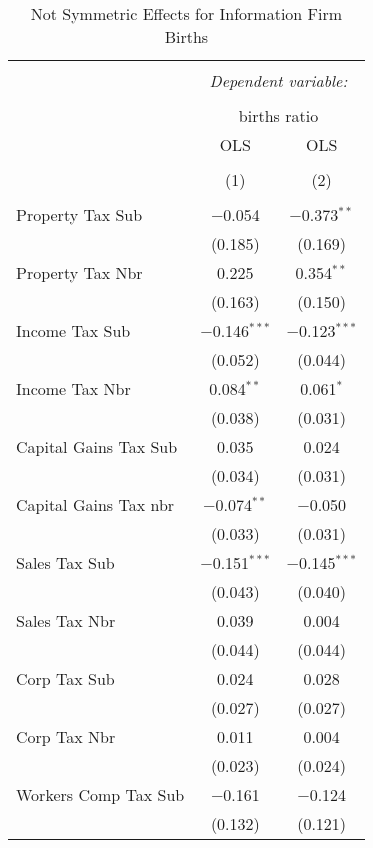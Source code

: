 
\begin{table}[!htbp] \centering 
  \caption{Not Symmetric Effects for  Information Firm Births} 
  \label{} 
\begin{tabular}{@{\extracolsep{5pt}}lcc} 
\\[-1.8ex]\hline 
\hline \\[-1.8ex] 
 & \multicolumn{2}{c}{\textit{Dependent variable:}} \\ 
\cline{2-3} 
\\[-1.8ex] & \multicolumn{2}{c}{births ratio} \\ 
 & OLS & OLS \\ 
\\[-1.8ex] & (1) & (2)\\ 
\hline \\[-1.8ex] 
 Property Tax Sub & $-$0.054 & $-$0.373$^{**}$ \\ 
  & (0.185) & (0.169) \\ 
  Property Tax Nbr & 0.225 & 0.354$^{**}$ \\ 
  & (0.163) & (0.150) \\ 
  Income Tax Sub & $-$0.146$^{***}$ & $-$0.123$^{***}$ \\ 
  & (0.052) & (0.044) \\ 
  Income Tax Nbr & 0.084$^{**}$ & 0.061$^{*}$ \\ 
  & (0.038) & (0.031) \\ 
  Capital Gains Tax Sub & 0.035 & 0.024 \\ 
  & (0.034) & (0.031) \\ 
  Capital Gains Tax nbr & $-$0.074$^{**}$ & $-$0.050 \\ 
  & (0.033) & (0.031) \\ 
  Sales Tax Sub & $-$0.151$^{***}$ & $-$0.145$^{***}$ \\ 
  & (0.043) & (0.040) \\ 
  Sales Tax Nbr & 0.039 & 0.004 \\ 
  & (0.044) & (0.044) \\ 
  Corp Tax Sub & 0.024 & 0.028 \\ 
  & (0.027) & (0.027) \\ 
  Corp Tax Nbr & 0.011 & 0.004 \\ 
  & (0.023) & (0.024) \\ 
  Workers Comp Tax Sub & $-$0.161 & $-$0.124 \\ 
  & (0.132) & (0.121) \\ 

\end{tabular}
\end{table}
